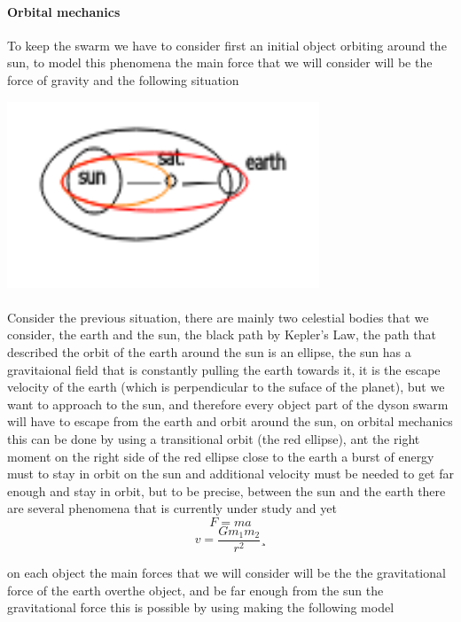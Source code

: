 \documentclass{article}
\begin{document}
\paragraph{Orbital mechanics} To keep the swarm we have to consider first an initial object orbiting around the sun, to model this phenomena the main force that we will consider will be the force of gravity and the following situation
\begin{center}
	\includegraphics{img/put_it_there.png}
\end{center}
\paragraph{} Consider the previous situation, there are mainly two celestial bodies that we consider, the earth and the sun, the black path by Kepler's Law, the path that described the orbit of the earth around  the sun is an ellipse, the sun has a gravitaional field that is constantly pulling the earth towards it, it is the escape velocity of the earth (which is perpendicular to the suface of the planet), but we want to approach to the sun, and therefore every object part of the dyson swarm will have to escape from the earth and orbit around the sun, on orbital mechanics this can be done by using a transitional orbit (the red ellipse), ant the right moment on the right side of the red ellipse close to the earth a burst of energy must to stay in orbit on the sun and additional velocity must be needed to get far enough and stay in orbit, but to be precise, between the sun and the earth there are several phenomena that is currently under study and yet
\begin{equation}
F = ma
\end{equation}
\begin{equation}
v = \frac{G m_1 m_2}{r^2}¸
\end{equation}
	
on each object the main forces that we will consider will be the the gravitational force of the earth overthe  object, and be far enough from the sun the gravitational force this is possible by using making the following model
\end{document}
